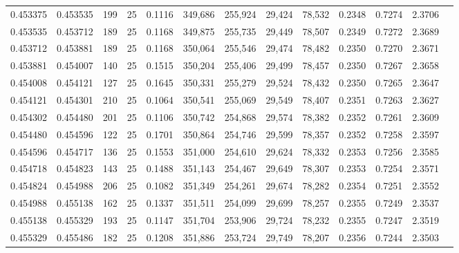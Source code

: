 \begin{tabular}{rrrrrrrrrrrrr}
0.453375 & 0.453535 &   199 &  25 &                                     0.1116 & 349,686 & 255,924 &  29,424 &  78,532 & 0.2348 & 0.7274 & 2.3706 \\
0.453535 & 0.453712 &   189 &  25 &                                     0.1168 & 349,875 & 255,735 &  29,449 &  78,507 & 0.2349 & 0.7272 & 2.3689 \\
0.453712 & 0.453881 &   189 &  25 &                                     0.1168 & 350,064 & 255,546 &  29,474 &  78,482 & 0.2350 & 0.7270 & 2.3671 \\
0.453881 & 0.454007 &   140 &  25 &                                     0.1515 & 350,204 & 255,406 &  29,499 &  78,457 & 0.2350 & 0.7267 & 2.3658 \\
0.454008 & 0.454121 &   127 &  25 &                                     0.1645 & 350,331 & 255,279 &  29,524 &  78,432 & 0.2350 & 0.7265 & 2.3647 \\
0.454121 & 0.454301 &   210 &  25 &                                     0.1064 & 350,541 & 255,069 &  29,549 &  78,407 & 0.2351 & 0.7263 & 2.3627 \\
0.454302 & 0.454480 &   201 &  25 &                                     0.1106 & 350,742 & 254,868 &  29,574 &  78,382 & 0.2352 & 0.7261 & 2.3609 \\
0.454480 & 0.454596 &   122 &  25 &                                     0.1701 & 350,864 & 254,746 &  29,599 &  78,357 & 0.2352 & 0.7258 & 2.3597 \\
0.454596 & 0.454717 &   136 &  25 &                                     0.1553 & 351,000 & 254,610 &  29,624 &  78,332 & 0.2353 & 0.7256 & 2.3585 \\
0.454718 & 0.454823 &   143 &  25 &                                     0.1488 & 351,143 & 254,467 &  29,649 &  78,307 & 0.2353 & 0.7254 & 2.3571 \\
0.454824 & 0.454988 &   206 &  25 &                                     0.1082 & 351,349 & 254,261 &  29,674 &  78,282 & 0.2354 & 0.7251 & 2.3552 \\
0.454988 & 0.455138 &   162 &  25 &                                     0.1337 & 351,511 & 254,099 &  29,699 &  78,257 & 0.2355 & 0.7249 & 2.3537 \\
0.455138 & 0.455329 &   193 &  25 &                                     0.1147 & 351,704 & 253,906 &  29,724 &  78,232 & 0.2355 & 0.7247 & 2.3519 \\
0.455329 & 0.455486 &   182 &  25 &                                     0.1208 & 351,886 & 253,724 &  29,749 &  78,207 & 0.2356 & 0.7244 & 2.3503 \\

\end{tabular}
